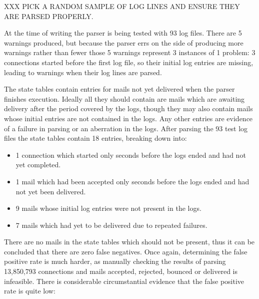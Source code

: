 \documentclass[a4paper,12pt,draft]{article}
\newcommand{\numberOFlogFILES}[0]{%
    93%
}
\begin{document}
XXX PICK A RANDOM SAMPLE OF LOG LINES AND ENSURE THEY ARE PARSED
PROPERLY\@.

At the time of writing the parser is being tested with \numberOFlogFILES{}
log files.  There are 5 warnings produced, but because the parser errs on
the side of producing more warnings rather than fewer those 5 warnings
represent 3 instances of 1 problem: 3 connections started before the first
log file, so their initial log entries are missing, leading to warnings
when their log lines are parsed.

The state tables contain entries for mails not yet delivered when the
parser finishes execution.  Ideally all they should contain are mails which
are awaiting delivery after the period covered by the logs, though they may
also contain mails whose initial entries are not contained in the logs.
Any other entries are evidence of a failure in parsing or an aberration in
the logs.  After parsing the \numberOFlogFILES{} test log files the state
tables contain 18 entries, breaking down into:

\begin{itemize}

    \item 1 connection which started only seconds before the logs ended and
        had not yet completed.

    \item 1 mail which had been accepted only seconds before the logs ended
        and had not yet been delivered.

    \item 9 mails whose initial log entries were not present in the logs.

    \item 7 mails which had yet to be delivered due to repeated failures.

\end{itemize}

There are no mails in the state tables which should not be present, thus it
can be concluded that there are zero false negatives.  Once again,
determining the false positive rate is much harder, as manually checking
the results of parsing 13,850,793 connections and mails accepted, rejected,
bounced or delivered is infeasible.  There is considerable circumstantial
evidence that the false positive rate is quite low:
\end{document}

